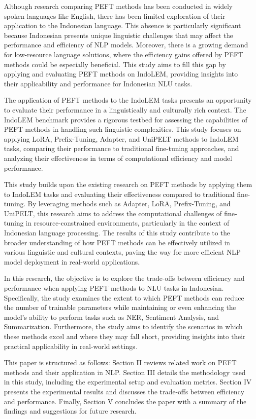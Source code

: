 Although research comparing PEFT methods has been conducted in widely spoken languages like English, there has been limited exploration of their application to the Indonesian language. This absence is particularly significant because Indonesian presents unique linguistic challenges that may affect the performance and efficiency of NLP models. Moreover, there is a growing demand for low-resource language solutions, where the efficiency gains offered by PEFT methods could be especially beneficial. This study aims to fill this gap by applying and evaluating PEFT methods on IndoLEM, providing insights into their applicability and performance for Indonesian NLU tasks.

The application of PEFT methods to the IndoLEM tasks presents an opportunity to evaluate their performance in a linguistically and culturally rich context. The IndoLEM benchmark provides a rigorous testbed for assessing the capabilities of PEFT methods in handling such linguistic complexities. This study focuses on applying LoRA, Prefix-Tuning, Adapter, and UniPELT methods to IndoLEM tasks, comparing their performance to traditional fine-tuning approaches, and analyzing their effectiveness in terms of computational efficiency and model performance.

This study builds upon the existing research on PEFT methods by applying them to IndoLEM tasks and evaluating their effectiveness compared to traditional fine-tuning. By leveraging methods such as Adapter, LoRA, Prefix-Tuning, and UniPELT, this research aims to address the computational challenges of fine-tuning in resource-constrained environments, particularly in the context of Indonesian language processing. The results of this study contribute to the broader understanding of how PEFT methods can be effectively utilized in various linguistic and cultural contexts, paving the way for more efficient NLP model deployment in real-world applications.

In this research, the objective is to explore the trade-offs between efficiency and performance when applying PEFT methods to NLU tasks in Indonesian. Specifically, the study examines the extent to which PEFT methods can reduce the number of trainable parameters while maintaining or even enhancing the model's ability to perform tasks such as NER, Sentiment Analysis, and Summarization. Furthermore, the study aims to identify the scenarios in which these methods excel and where they may fall short, providing insights into their practical applicability in real-world settings.

This paper is structured as follows: Section II reviews related work on PEFT methods and their application in NLP. Section III details the methodology used in this study, including the experimental setup and evaluation metrics. Section IV presents the experimental results and discusses the trade-offs between efficiency and performance. Finally, Section V concludes the paper with a summary of the findings and suggestions for future research.
